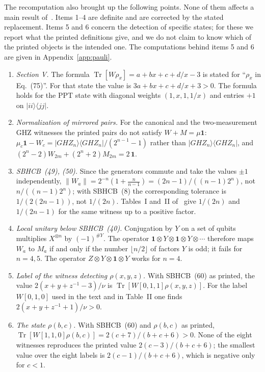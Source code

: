 \documentclass[11pt,a4paper]{article}
\theoremstyle{remark}
\newcommand{\ketbra}[2]{\lvert #1\rangle\langle #2\rvert}
\newcommand{\id}{\mathbf{1}}
\newcommand{\tr}{\operatorname{Tr}}
\begin{document}
The recomputation also brought up the following points. None of them affects a main
result of~\cite{SBHCB26}. Items 1--4 are definite and are corrected by the stated
replacement. Items 5 and 6 concern the detection of specific states; for these we report
what the printed definitions give, and we do not claim to know which of the printed
objects is the intended one. The computations behind items 5 and 6 are given in
Appendix~\ref{app:pauli}.
\begin{enumerate}
\item \emph{Section V.} The formula $\tr[W\rho_x]=a+bx+c+d/x-3$ is stated for
``$\rho_x$ in Eq.~(75)''. For that state the value is $3a+bx+c+d/x+3>0$. The formula
holds for the PPT state with diagonal weights $(1,x,1,1/x)$ and entries $+1$ on
$\ketbra{ii}{jj}$.
\item \emph{Normalization of mirrored pairs.} For the canonical and the two-measurement
GHZ witnesses the printed pairs do not satisfy $W+M=\mu\id$:
$\mu_c\id-W_c=\ketbra{GHZ_n}{GHZ_n}/(2^{n-1}-1)$ rather than $\ketbra{GHZ_n}{GHZ_n}$,
and $(2^n-2)W_{2m}+(2^n+2)M_{2m}=2\,\id$.
\item \emph{SBHCB~(49), (50).} Since the generators commute and take the values $\pm1$
independently, $\|W_a\|=2^{-n}(1+\tfrac{n}{n-1})=(2n-1)/((n-1)2^n)$, not
$n/((n-1)2^n)$; with SBHCB~(8) the corresponding tolerance is $1/(2(2n-1))$, not
$1/(2n)$. Tables~I and~II of~\cite{SBHCB26} give $1/(2n)$ and $1/(2n-1)$ for the same
witness up to a positive factor.
\item \emph{Local unitary below SBHCB~(40).} Conjugation by $Y$ on a set of qubits
multiplies $X^{\otimes n}$ by $(-1)^{\#Y}$. The operator
$\id\otimes Y\otimes\id\otimes Y\otimes\cdots$ therefore maps $W_a$ to $M_a$ if and only
if the number $\lfloor n/2\rfloor$ of factors $Y$ is odd; it fails for $n=4,5$. The
operator $Z\otimes Y\otimes\id\otimes Y$ works for $n=4$.
\item \emph{Label of the witness detecting $\rho(x,y,z)$.} With SBHCB~(60) as printed,
the value $2(x+y+z^{-1}-3)/\nu$ is $\tr[W[0,1,1]\rho(x,y,z)]$. For the label $W[0,1,0]$
used in the text and in Table~II one finds $2(x+y+z^{-1}+1)/\nu>0$.
\item \emph{The state $\rho(b,c)$.} With SBHCB~(60) and $\rho(b,c)$ as printed,
$\tr[W[1,1,0]\rho(b,c)]=2(c+7)/(b+c+6)>0$. None of the eight witnesses reproduces the
printed value $2(c-3)/(b+c+6)$; the smallest value over the eight labels is
$2(c-1)/(b+c+6)$, which is negative only for $c<1$.
\end{enumerate}
\end{document}
